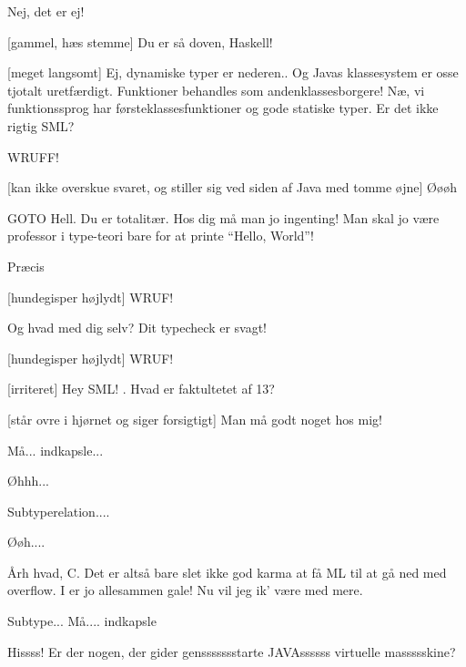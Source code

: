 \documentclass[a4paper,11pt]{article}
\begin{document}
\begin{sketch}

 Nej, det er ej!

[gammel, h\ae{}s stemme] Du er s\aa{} doven, Haskell!

[meget langsomt] Ej, dynamiske typer er nederen.. Og Javas
klassesystem er osse tjotalt uretf\ae{}rdigt. Funktioner behandles som
andenklassesborgere!  N\ae, vi funktionssprog har f\o{}rsteklassesfunktioner og gode statiske typer. Er det ikke rigtig SML?

 WRUFF! 

[kan ikke overskue svaret, og stiller sig ved siden af Java
med tomme \o{}jne] \O\o\o{}h


  GOTO Hell. Du er totalit\ae{}r. Hos dig m\aa{} man jo ingenting! Man skal
jo v\ae{}re professor i type-teori bare for at printe ``Hello, World''!

 Pr\ae{}cis 

[hundegisper h\o{}jlydt] WRUF!

 Og hvad med dig selv? Dit typecheck er svagt! 

[hundegisper h\o{}jlydt] WRUF!

[irriteret] Hey SML! . Hvad er faktultetet af 13?


[st\aa{}r ovre i hj\o{}rnet og siger forsigtigt] Man m\aa{} godt noget hos mig!

 M\aa{}... indkapsle...

  \O hhh...

 Subtyperelation....

 \O \o{}h....


 \AA rh hvad, C. Det er alts\aa{} bare slet ikke god karma at f\aa{} ML til at g\aa{} ned med overflow.  I er jo allesammen gale! Nu vil jeg ik' v\ae{}re med mere. 

 Subtype... M\aa{}.... indkapsle

 Hissss! Er der nogen, der gider genssssssstarte JAVAssssss
virtuelle massssskine? 


\end{sketch}
\end{document}

